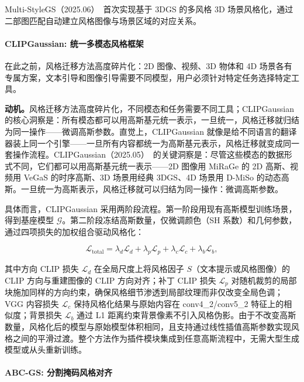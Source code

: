 Multi-StyleGS（2025.06）~\cite{2506_06846}首次实现基于 3DGS 的多风格 3D 场景风格化，通过二部图匹配自动建立风格图像与场景区域的对应关系。

\paragraph{CLIPGaussian: 统一多模态风格框架}

在此之前，风格迁移方法高度碎片化：2D 图像、视频、3D 物体和 4D 场景各有专属方案，文本引导和图像引导需要不同模型，用户必须针对特定任务选择特定工具。

\textbf{动机。}风格迁移方法高度碎片化，不同模态和任务需要不同工具；CLIPGaussian 的核心洞察是：所有模态都可以用高斯基元统一表示，一旦统一，风格迁移就归结为同一操作——微调高斯参数。直觉上，CLIPGaussian 就像是给不同语言的翻译器装上同一个引擎——一旦所有内容都统一为高斯基元表示，风格迁移就变成同一套操作流程。CLIPGaussian（2025.05）~\cite{2505_22854}的关键洞察是：尽管这些模态的数据形式不同，它们都可以用高斯基元统一表示——2D 图像用 MiRaGe 的 2D 高斯、视频用 VeGaS 的时序高斯、3D 场景用经典 3DGS、4D 场景用 D-MiSo 的动态高斯。一旦统一为高斯表示，风格迁移就可以归结为同一操作：微调高斯参数。

具体而言，CLIPGaussian 采用两阶段流程。第一阶段用现有高斯模型训练场景，得到基座模型 $\mathcal{G}$。第二阶段冻结高斯数量，仅微调颜色（SH 系数）和几何参数，通过四项损失的加权组合驱动风格化：

\begin{equation}
  \mathcal{L}_{\text{total}} = \lambda_d \mathcal{L}_d + \lambda_p \mathcal{L}_p + \lambda_c \mathcal{L}_c + \lambda_b \mathcal{L}_b,
\end{equation}

其中方向 CLIP 损失 $\mathcal{L}_d$ 在全局尺度上将风格因子 $S$（文本提示或风格图像）的 CLIP 方向与重建图像的 CLIP 方向对齐；补丁 CLIP 损失 $\mathcal{L}_p$ 对随机裁剪的局部块施加同样的方向约束，确保风格细节渗透到局部纹理而非仅改变全局色调；VGG 内容损失 $\mathcal{L}_c$ 保持风格化结果与原始内容在 conv4\_2/conv5\_2 特征上的相似度；背景损失 $\mathcal{L}_b$ 通过 L1 距离约束背景像素不引入风格伪影。由于不改变高斯数量，风格化后的模型与原始模型体积相同，且支持通过线性插值高斯参数实现风格之间的平滑过渡。整个方法作为插件模块集成到任意高斯流程中，无需大型生成模型或从头重新训练。

\paragraph{ABC-GS: 分割掩码风格对齐}

